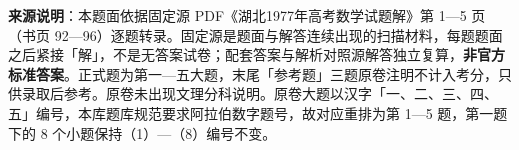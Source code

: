 


\begin{gktip}
\textbf{来源说明}：本题面依据固定源 PDF《湖北1977年高考数学试题解》第 1—5 页（书页 92—96）逐题转录。固定源是题面与解答连续出现的扫描材料，每题题面之后紧接「解」，不是无答案试卷；配套答案与解析对照源解答独立复算，\textbf{非官方标准答案}。正式题为第一—五大题，末尾「参考题」三题原卷注明不计入考分，只供录取后参考。原卷未出现文理分科说明。原卷大题以汉字「一、二、三、四、五」编号，本库题库规范要求阿拉伯数字题号，故对应重排为第 1—5 题，第一题下的 8 个小题保持（1）—（8）编号不变。
\end{gktip}

\par\medskip

